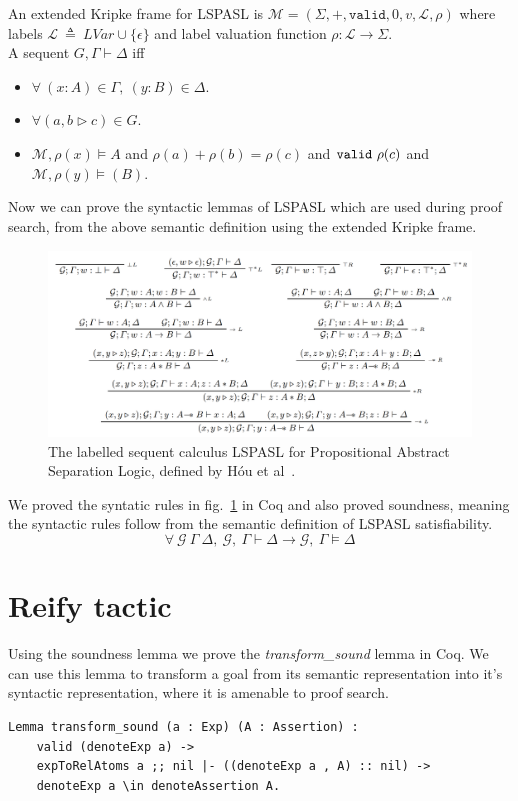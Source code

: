 \documentclass[12pt,lettersize]{article}
\begin{document}
An extended Kripke frame for LSPASL is $\mathcal{M} = (\Sigma, +, \texttt{valid}, 0, v, \mathcal{L}, \rho)$ where
labels $\mathcal{L}\ \triangleq \ LVar \cup \{ \epsilon \}$ and
label valuation function $\rho: \mathcal{L} \to \Sigma$. \\

\noindent A sequent $G, \Gamma \vdash \Delta$ iff
\begin{itemize}
\item $\forall\ (x: A) \in \Gamma,\ (y: B) \in \Delta$.
\item $\forall (a, b \triangleright c) \in G$.
\item $\mathcal{M}, \rho(x) \vDash A$ and
      $\rho(a) + \rho(b) = \rho(c)$ and $\texttt{valid}\ \rho(c)$ and
      $\mathcal{M}, \rho(y) \vDash(B) $.
\end{itemize}

Now we can prove the syntactic lemmas of LSPASL which are used during proof search, from the above semantic definition using the extended Kripke frame.

\begin{figure}
\includegraphics[width=\textwidth]{LSPASLtrans.png}
\caption{The labelled sequent calculus LSPASL for Propositional Abstract Separation Logic, defined by H\'{o}u et al~\cite{hou2017proof}.}
\label{fig:lspasl}
\end{figure}

We proved the syntatic rules in fig.~\ref{fig:lspasl} in Coq and also proved soundness, meaning the syntactic rules follow from the semantic definition
of LSPASL satisfiability.
$$ \forall\ \mathcal{G} \ \Gamma\ \Delta, \ \mathcal{G},\ \Gamma \vdash \Delta  \to  \mathcal{G},\ \Gamma \vDash \Delta $$

\section{Reify tactic}

Using the soundness lemma we prove the \emph{transform\_sound} lemma in Coq. We can use this lemma to transform a goal from
its semantic representation into it's syntactic representation, where it is amenable to proof search.
\begin{lstlisting}[style=coq]
Lemma transform_sound (a : Exp) (A : Assertion) :
    valid (denoteExp a) ->
    expToRelAtoms a ;; nil |- ((denoteExp a , A) :: nil) ->
    denoteExp a \in denoteAssertion A.
\end{lstlisting}
\end{document}
